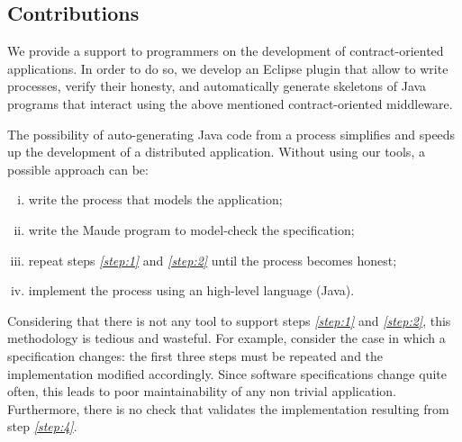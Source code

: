 
\subsection*{Contributions}


We provide a support to programmers on the development of contract-oriented 
applications. 
In order to do so, we develop an Eclipse plugin that allow to write \coco processes, verify their honesty, and automatically generate skeletons of Java programs that interact using the above mentioned contract-oriented middleware.

The possibility of auto-generating Java code from a \coco process simplifies and speeds up the development of a distributed application.
Without using our tools, a possible approach can be:
\begin{enumerate}[(i),topsep=5pt,itemsep=1pt,parsep=0pt]
	\item\label{step:1} write the \coco process that models the application;
	\item\label{step:2} write the Maude program to model-check the specification;
	\item\label{step:3} repeat steps \textit{\ref{step:1}} and \textit{\ref{step:2}} until the process becomes honest;
	\item\label{step:4} implement the process using an high-level language (\eg Java).
\end{enumerate}
Considering that there is not any tool to support steps \textit{\ref{step:1}} and \textit{\ref{step:2}}, this methodology is tedious and wasteful. For example, consider the case in which a specification changes: the first three steps must be repeated and the implementation modified accordingly. 
Since software specifications change quite often, 
this leads to poor maintainability of any non trivial application. %
Furthermore, there is no check that validates the implementation 
resulting from step \textit{\ref{step:4}}.

